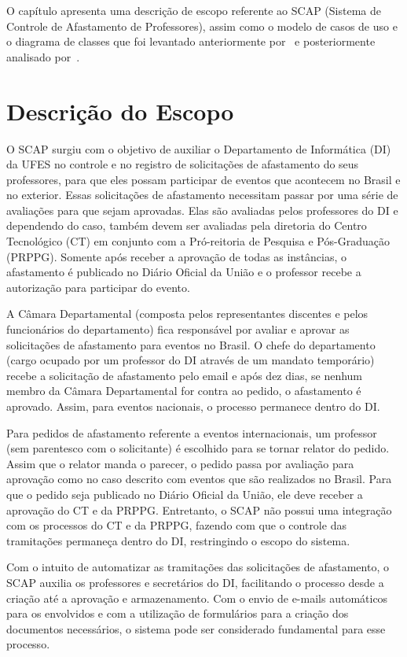 O capítulo apresenta uma descrição de escopo referente ao SCAP (Sistema de Controle de Afastamento de Professores), assim como o modelo de casos de uso e o diagrama de classes que foi levantado anteriormente por~ e posteriormente analisado por~. 

\section{Descrição do Escopo}
\label{sec-requisitos-descricao-escopo}

O SCAP surgiu com o objetivo de auxiliar o Departamento de Informática (DI) da UFES no controle e no registro de solicitações de afastamento do seus professores, para que eles possam participar de eventos que acontecem no Brasil e no exterior. Essas solicitações de afastamento necessitam passar por uma série de avaliações para que sejam aprovadas. Elas são avaliadas pelos professores do DI e dependendo do caso, também devem ser avaliadas pela diretoria do Centro Tecnológico (CT) em conjunto com a Pró-reitoria de Pesquisa e Pós-Graduação (PRPPG). Somente após receber a aprovação de todas as instâncias, o afastamento é publicado no Diário Oficial da União e o professor recebe a autorização para participar do evento.     

A Câmara Departamental (composta pelos representantes discentes e pelos funcionários do departamento) fica responsável por avaliar e aprovar as solicitações de afastamento para eventos no Brasil. O chefe do departamento (cargo ocupado por um professor do DI através de um mandato temporário) recebe a solicitação de afastamento pelo email e após dez dias, se nenhum membro da Câmara Departamental for contra ao pedido, o afastamento é aprovado. Assim, para eventos nacionais, o processo permanece dentro do DI.

Para pedidos de afastamento referente a eventos internacionais, um professor (sem parentesco com o solicitante) é escolhido para se tornar relator do pedido. Assim que o relator manda o parecer, o pedido passa por avaliação para aprovação como no caso descrito com eventos que são realizados no Brasil. Para que o pedido seja publicado no Diário Oficial da União, ele deve receber a aprovação do CT e da PRPPG. Entretanto, o SCAP não possui uma integração com os processos do CT e da PRPPG, fazendo com que o controle das tramitações permaneça dentro do DI, restringindo o escopo do sistema.

Com o intuito de automatizar as tramitações das solicitações de afastamento, o SCAP auxilia os professores e secretários do DI, facilitando o processo desde a criação até a aprovação e armazenamento. Com o envio de e-mails automáticos para os envolvidos e com a utilização de formulários para a criação dos documentos necessários, o sistema pode ser considerado fundamental para esse processo.      

